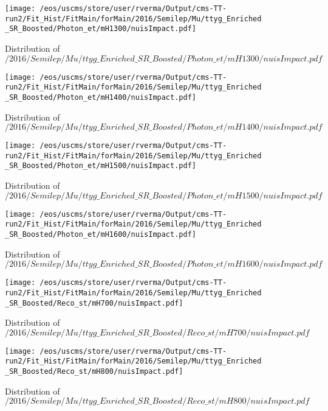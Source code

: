 \begin{figure}
\centering
\texttt{[image: /eos/uscms/store/user/rverma/Output/cms-TT-run2/Fit\_Hist/FitMain/forMain/2016/Semilep/Mu/ttyg\_Enriched\_SR\_Boosted/Photon\_et/mH1300/nuisImpact.pdf]}
\caption{Distribution of $/2016/Semilep/Mu/ttyg\_Enriched\_SR\_Boosted/Photon\_et/mH1300/nuisImpact.pdf$}
\end{figure}

\begin{figure}
\centering
\texttt{[image: /eos/uscms/store/user/rverma/Output/cms-TT-run2/Fit\_Hist/FitMain/forMain/2016/Semilep/Mu/ttyg\_Enriched\_SR\_Boosted/Photon\_et/mH1400/nuisImpact.pdf]}
\caption{Distribution of $/2016/Semilep/Mu/ttyg\_Enriched\_SR\_Boosted/Photon\_et/mH1400/nuisImpact.pdf$}
\end{figure}

\begin{figure}
\centering
\texttt{[image: /eos/uscms/store/user/rverma/Output/cms-TT-run2/Fit\_Hist/FitMain/forMain/2016/Semilep/Mu/ttyg\_Enriched\_SR\_Boosted/Photon\_et/mH1500/nuisImpact.pdf]}
\caption{Distribution of $/2016/Semilep/Mu/ttyg\_Enriched\_SR\_Boosted/Photon\_et/mH1500/nuisImpact.pdf$}
\end{figure}

\begin{figure}
\centering
\texttt{[image: /eos/uscms/store/user/rverma/Output/cms-TT-run2/Fit\_Hist/FitMain/forMain/2016/Semilep/Mu/ttyg\_Enriched\_SR\_Boosted/Photon\_et/mH1600/nuisImpact.pdf]}
\caption{Distribution of $/2016/Semilep/Mu/ttyg\_Enriched\_SR\_Boosted/Photon\_et/mH1600/nuisImpact.pdf$}
\end{figure}

\begin{figure}
\centering
\texttt{[image: /eos/uscms/store/user/rverma/Output/cms-TT-run2/Fit\_Hist/FitMain/forMain/2016/Semilep/Mu/ttyg\_Enriched\_SR\_Boosted/Reco\_st/mH700/nuisImpact.pdf]}
\caption{Distribution of $/2016/Semilep/Mu/ttyg\_Enriched\_SR\_Boosted/Reco\_st/mH700/nuisImpact.pdf$}
\end{figure}

\begin{figure}
\centering
\texttt{[image: /eos/uscms/store/user/rverma/Output/cms-TT-run2/Fit\_Hist/FitMain/forMain/2016/Semilep/Mu/ttyg\_Enriched\_SR\_Boosted/Reco\_st/mH800/nuisImpact.pdf]}
\caption{Distribution of $/2016/Semilep/Mu/ttyg\_Enriched\_SR\_Boosted/Reco\_st/mH800/nuisImpact.pdf$}
\end{figure}

